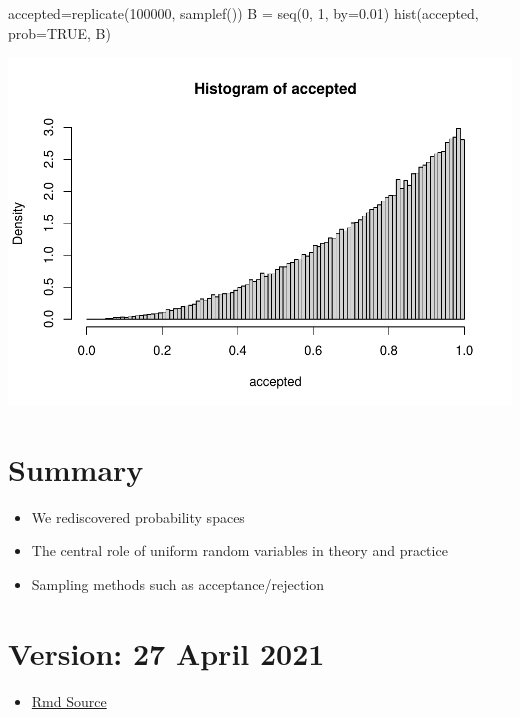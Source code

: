 \documentclass[
]{article}
\newenvironment{Shaded}{\begin{snugshade}}{\end{snugshade}}
\newcommand{\AttributeTok}[1]{\textcolor[rgb]{0.77,0.63,0.00}{#1}}
\newcommand{\ConstantTok}[1]{\textcolor[rgb]{0.00,0.00,0.00}{#1}}
\newcommand{\DecValTok}[1]{\textcolor[rgb]{0.00,0.00,0.81}{#1}}
\newcommand{\FloatTok}[1]{\textcolor[rgb]{0.00,0.00,0.81}{#1}}
\newcommand{\FunctionTok}[1]{\textcolor[rgb]{0.00,0.00,0.00}{#1}}
\newcommand{\NormalTok}[1]{#1}
\newcommand{\OtherTok}[1]{\textcolor[rgb]{0.56,0.35,0.01}{#1}}
\providecommand{\tightlist}{%
  \setlength{\itemsep}{0pt}\setlength{\parskip}{0pt}}
\theoremstyle{definition}
\theoremstyle{definition}
\theoremstyle{definition}
\theoremstyle{remark}
\begin{document}
\begin{Shaded}
\begin{Highlighting}[]
\NormalTok{accepted}\OtherTok{=}\FunctionTok{replicate}\NormalTok{(}\DecValTok{100000}\NormalTok{, }\FunctionTok{samplef}\NormalTok{())}
\NormalTok{B }\OtherTok{=} \FunctionTok{seq}\NormalTok{(}\DecValTok{0}\NormalTok{, }\DecValTok{1}\NormalTok{, }\AttributeTok{by=}\FloatTok{0.01}\NormalTok{)}
\FunctionTok{hist}\NormalTok{(accepted, }\AttributeTok{prob=}\ConstantTok{TRUE}\NormalTok{, B)}
\end{Highlighting}
\end{Shaded}

\includegraphics{randomTP_files/figure-latex/unnamed-chunk-5-1.pdf}

\hypertarget{summary}{%
\section{Summary}\label{summary}}

\begin{itemize}
\tightlist
\item
  We rediscovered probability spaces
\item
  The central role of uniform random variables in theory and practice
\item
  Sampling methods such as acceptance/rejection
\end{itemize}

\hypertarget{version-27-april-2021}{%
\section{Version: 27 April 2021}\label{version-27-april-2021}}

\begin{itemize}
\tightlist
\item
  \href{https://tsoo-math.github.io/ucl/randomTP.Rmd}{Rmd Source}
\end{itemize}
\end{document}
